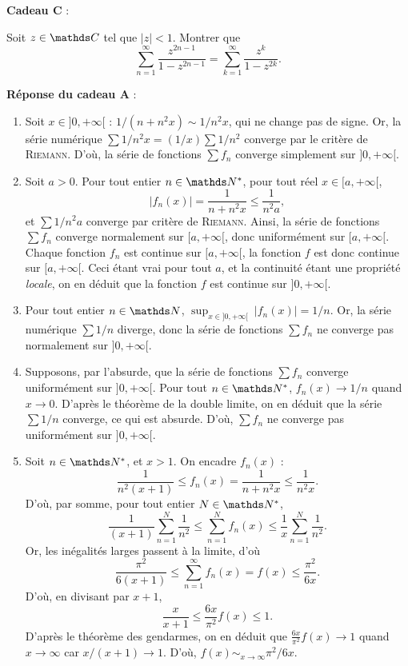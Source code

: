 \documentclass[a4paper]{article}
\begin{document}
	\bigskip

	\centerline{}

	\textbf{Cadeau C} :\\
	\begin{slshape}
		Soit $z \in \C$ tel que $|z| < 1$.
		Montrer que \[
			\sum_{n=1}^\infty \frac{z^{2n-1}}{1-z^{2n-1}} = \sum_{k=1}^\infty \frac{z^k}{1-z^{2k}}
		.\]
	\end{slshape}


	\bigskip\bigskip
	\textbf{Réponse du cadeau A} :\\
	\begin{enumerate}
		\item Soit $x \in {]0,+\infty[}$ : $1 / (n + n^2 x) \sim 1 / n^2 x$, qui ne change pas de signe.
			Or, la série numérique $\sum 1 / n^2 x = (1/x) \sum 1 / n^2$ converge par le critère de \textsc{Riemann}.
			D'où, la série de fonctions $\sum f_n$\/ converge simplement sur $]0,+\infty[$.
		\item Soit $a > 0$. Pour tout entier $n \in \N^*$, pour tout réel $x \in [a, +\infty[$, \[
				\big|f_n(x)\big| = \frac{1}{n + n^2 x} \le \frac{1}{n^2 a}
			,\] et $\sum 1/n^2 a$\/ converge par critère de \textsc{Riemann}.
			Ainsi, la série de fonctions $\sum f_n$\/ converge normalement sur $[a,+\infty[$, donc uniformément sur $[a,+\infty[$.
			Chaque fonction $f_n$ est continue sur $[a,+\infty[$, la fonction $f$ est donc continue sur $[a,+\infty[$.
			Ceci étant vrai pour tout $a$, et la continuité étant une propriété \textit{locale}, on en déduit que la fonction $f$ est continue sur $]0,+\infty[$.
		\item[2{,}5.] Pour tout entier $n \in \N$, $\sup_{x \in {]0,+\infty[}}\:|f_n(x)| = 1 / n$.
			Or, la série numérique $\sum 1 / n$ diverge, donc la série de fonctions $\sum f_n$ ne converge pas normalement sur $]0,+\infty[$.
		\item Supposons, par l'absurde, que la série de fonctions $\sum f_n$ converge uniformément sur $]0,+\infty[$.
			Pour tout $n \in \N^*$, $f_n(x) \to 1 / n$ quand $x \to 0$.
			D'après le théorème de la double limite, on en déduit que la série $\sum 1 / n$ converge, ce qui est absurde.
			D'où, $\sum f_n$ ne converge pas uniformément sur $]0,+\infty[$.
		\item Soit $n \in \N^*$, et $x > 1$. On encadre $f_n(x)$ : \[
				\frac{1}{n^2(x+1)} \le f_n(x) = \frac{1}{n + n^2 x} \le \frac{1}{n^2x}
			.\]D'où, par somme, pour tout entier $N \in \N^*$, \[
				\frac{1}{(x+1)}\sum_{n = 1}^N \frac{1}{n^2} \le \sum_{n=1}^N f_n(x) \le \frac{1}{x}\sum_{n = 1}^N \frac{1}{n^2}
			.\]Or, les inégalités larges passent à la limite, d'où \[
				\frac{\pi^2}{6(x+1)} \le \sum_{n=1}^\infty f_n(x) = f(x) \le \frac{\pi^2}{6x}
			.\]D'où, en divisant par $x + 1$, \[
				\frac{x}{x+1} \le \frac{6x}{\pi^2} f(x) \le 1
			.\]D'après le théorème des gendarmes, on en déduit que $\frac{6x}{\pi^2} f(x) \to 1$ quand $x \to \infty$ car $x / (x+1) \to 1$.
			D'où, $f(x) \sim_{x \to \infty} \pi^2 / 6x$.
	\end{enumerate}
\end{document}
